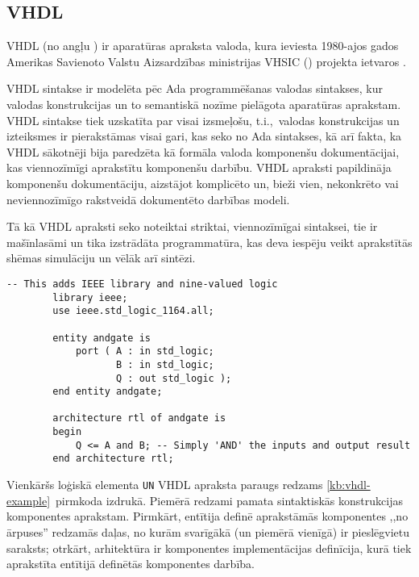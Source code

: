\subsection{VHDL} \label{sec:vhdl}
	VHDL (no angļu ) ir aparatūras apraksta
	valoda, kura ieviesta 1980-ajos gados Amerikas Savienoto Valstu
	Aizsardzības ministrijas
	VHSIC ()
	projekta ietvaros \cite[141.~lpp.]{VHSIC}\cite[1.~lpp.]{Perry-VHDL}.

	VHDL sintakse ir modelēta pēc Ada programmēšanas valodas sintakses, kur
	valodas konstrukcijas un to semantiskā nozīme pielāgota aparatūras aprakstam.
	VHDL sintakse tiek uzskatīta par visai izsmeļošu, t.i.,~valodas 
	konstrukcijas un izteiksmes ir pierakstāmas visai gari, kas seko no
	Ada sintakses, kā arī fakta, ka VHDL sākotnēji bija paredzēta kā 
	formāla valoda komponenšu dokumentācijai, kas viennozīmīgi aprakstītu
	komponenšu darbību.
	VHDL apraksti papildināja komponenšu dokumentāciju,
	aizstājot komplicēto un, bieži vien,
	nekonkrēto vai neviennozīmīgo rakstveidā dokumentēto darbības modeli.
	
	Tā kā VHDL apraksti seko noteiktai striktai, viennozīmīgai sintaksei,
	tie ir mašīnlasāmi un tika izstrādāta programmatūra, kas deva
	iespēju veikt aprakstītās shēmas simulāciju un vēlāk arī sintēzi.

	\begin{lstlisting}[language={[qucs]VHDL},label=kb:vhdl-example,gobble=4,%
			caption={VHDL apraksts loģiskajam \texttt{UN} elementam.}]
		-- This adds IEEE library and nine-valued logic
		library ieee;
		use ieee.std_logic_1164.all;
		
		entity andgate is
			port ( A : in std_logic;
			       B : in std_logic;
			       Q : out std_logic );
		end entity andgate;
		
		architecture rtl of andgate is
		begin
			Q <= A and B; -- Simply 'AND' the inputs and output result
		end architecture rtl;
	\end{lstlisting}

	Vienkāršs loģiskā elementa \texttt{UN} VHDL apraksta paraugs redzams
	\ref{kb:vhdl-example}~pirmkoda izdrukā. Piemērā redzami pamata sintaktiskās
	konstrukcijas komponentes aprakstam.
	Pirmkārt, entītija definē aprakstāmās komponentes ,,no ārpuses''
	redzamās daļas, no kurām svarīgākā (un piemērā vienīgā) ir pieslēgvietu
	saraksts; otrkārt, arhitektūra ir komponentes implementācijas definīcija,
	kurā tiek aprakstīta entītijā definētās komponentes darbība.

